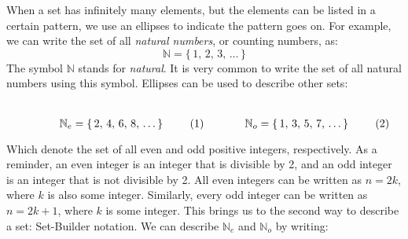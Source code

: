 \documentclass[crop=false,class=book,oneside]{standalone}                      %
\begin{document}
            When a set has infinitely many
            elements, but the elements can be listed
            in a certain pattern, we use an ellipses
            to indicate the pattern goes on.
            For example, we can write the set of all
            \textit{natural numbers}, or counting
            numbers, as:
            \begin{equation}
                \mathbb{N}=\{\,1,\,2,\,3,\,\hdots\,\}
            \end{equation}
            The symbol $\mathbb{N}$ stands for
            \textit{natural}. It is very common to write the set
            of all natural numbers using this symbol.
            Ellipses can be used to describe other sets:
            \par
            \begin{subequations}
                \begin{minipage}{0.49\textwidth}
                    \centering
                    \begin{equation}
                        \mathbb{N}_{e}
                        =\{\,2,\,4,\,6,\,8,\,\hdots\,\}
                    \end{equation}
                \end{minipage}
                \hfill
                \begin{minipage}{0.49\textwidth}
                    \centering
                    \begin{equation}
                        \mathbb{N}_{o}
                        =\{\,1,\,3,\,5,\,7,\,\hdots\,\}
                    \end{equation}
                \end{minipage}
            \end{subequations}
            \par\vspace{2.5ex}
            Which denote the set of all even and odd
            positive integers, respectively. As a reminder,
            an even integer is an integer that is
            divisible by 2, and an odd integer is an
            integer that is not divisible by 2. All even
            integers can be written as $n=2k$, where $k$
            is also some integer. Similarly, every odd
            integer can be written as $n=2k+1$, where
            $k$ is some integer. This brings us to the
            second way to describe a set: Set-Builder notation.
            We can describe $\mathbb{N}_{e}$ and $\mathbb{N}_{o}$
            by writing:
            \par
\end{document}

